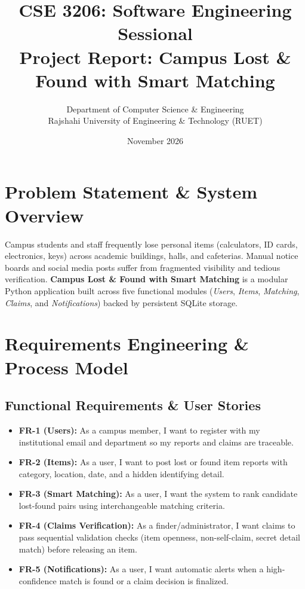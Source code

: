 \documentclass[12pt,a4paper]{article}
\title{\textbf{CSE 3206: Software Engineering Sessional}\\
Project Report: Campus Lost \& Found with Smart Matching}
\author{Department of Computer Science \& Engineering\\
Rajshahi University of Engineering \& Technology (RUET)}
\date{November 2026}
\begin{document}
\maketitle

\section{Problem Statement \& System Overview}
Campus students and staff frequently lose personal items (calculators, ID cards, electronics, keys) across academic buildings, halls, and cafeterias. Manual notice boards and social media posts suffer from fragmented visibility and tedious verification. \textbf{Campus Lost \& Found with Smart Matching} is a modular Python application built across five functional modules (\textit{Users}, \textit{Items}, \textit{Matching}, \textit{Claims}, and \textit{Notifications}) backed by persistent SQLite storage.

\section{Requirements Engineering \& Process Model}
\subsection{Functional Requirements \& User Stories}
\begin{itemize}
    \item \textbf{FR-1 (Users):} As a campus member, I want to register with my institutional email and department so my reports and claims are traceable.
    \item \textbf{FR-2 (Items):} As a user, I want to post lost or found item reports with category, location, date, and a hidden identifying detail.
    \item \textbf{FR-3 (Smart Matching):} As a user, I want the system to rank candidate lost-found pairs using interchangeable matching criteria.
    \item \textbf{FR-4 (Claims Verification):} As a finder/administrator, I want claims to pass sequential validation checks (item openness, non-self-claim, secret detail match) before releasing an item.
    \item \textbf{FR-5 (Notifications):} As a user, I want automatic alerts when a high-confidence match is found or a claim decision is finalized.
\end{itemize}
\end{document}
